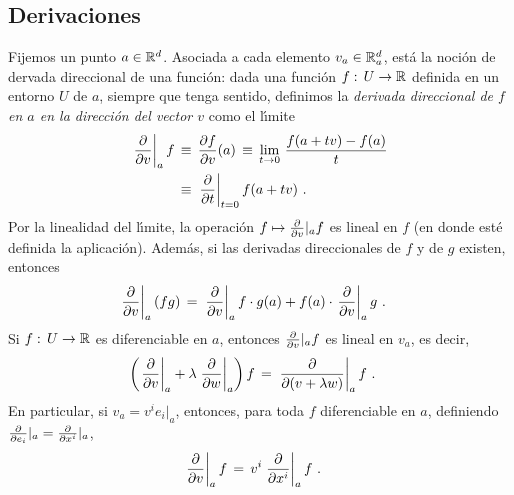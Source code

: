 \subsection{Derivaciones}
Fijemos un punto $a\in\mathbb{R}^{d}$. Asociada a cada elemento
$v_{a}\in\mathbb{R}^{d}_{a}$, est\'{a} la noci\'{o}n de dervada direccional de
una funci\'{o}n: dada una funci\'{o}n $f:\,U\rightarrow\mathbb{R}$ definida
en un entorno $U$ de $a$, siempre que tenga sentido, definimos la
\emph{derivada direccional de $f$ en $a$ en la direcci\'{o}n del vector $v$}
como el l\'{\i}mite
\begin{align*}
	\left.\gancho{v}\right|_{a}f & \,\equiv\,
		\frac{\partial f}{\partial v}(a)\,\equiv\,
		\lim_{t\to 0}\,\frac{f(a+tv)-f(a)}{t} \\
	& \,\equiv\,\left.\gancho{t}\right|_{t=0}f(a+tv)
	\text{ .}
\end{align*}
%
Por la linealidad del l\'{\i}mite, la operaci\'{o}n $f\mapsto\gancho{v}|_{a}f$
es lineal en $f$ (en donde est\'{e} definida la aplicaci\'{o}n). Adem\'{a}s,
si las derivadas direccionales de $f$ y de $g$ existen, entonces
\begin{align*}
	\left.\gancho{v}\right|_{a}(fg) & \,=\,
		\left.\gancho{v}\right|_{a}f\cdot g(a) +
		f(a)\cdot\left.\gancho{v}\right|_{a}g
	\text{ .}
\end{align*}
%
Si $f:\,U\rightarrow\mathbb{R}$ es diferenciable en $a$, entonces
$\gancho{v}|_{a}f$ es lineal en $v_{a}$, es decir,
\begin{align*}
	\left(\left.\gancho{v}\right|_{a}+\lambda
		\left.\gancho{w}\right|_{a}\right)f & \,=\,
		\left.\gancho{(v+\lambda w)}\right|_{a}f
	\text{ .}
\end{align*}
%
En particular, si $v_{a}=v^{i}e_{i}|_{a}$, entonces, para toda $f$
diferenciable en $a$, definiendo $\gancho{e_{i}}|_{a}=\gancho{x^{i}}|_{a}$,
\begin{align*}
	\left.\gancho{v}\right|_{a}f & \,=\,
		v^{i}\left.\gancho{x^{i}}\right|_{a}f
	\text{ .}
\end{align*}
%

